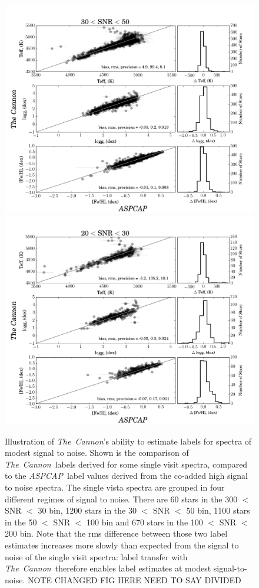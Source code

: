 \documentclass[12pt, preprint]{aastex}
\newcommand{\tc}{\textsl{The~Cannon}}
\newcommand{\aspcap}{\textsl{ASPCAP}}
\begin{document}
\begin{figure}[!h]
\includegraphics[scale=0.25]{./plots/SNR30to50.png}
\includegraphics[scale=0.25]{./plots/SNR20to30.png}
    \caption{Illustration of \tc's ability to estimate labels for spectra of modest signal to noise. Shown is the comparison of \tc\ labels derived for some single visit spectra, compared to the \aspcap\ label values derived from the co-added high signal to noise spectra. The single vista spectra are grouped in four different regimes of signal to noise. There are 60 stars in the 300 $<$  SNR $<$ 30 bin, 1200 stars in the 30 $<$ SNR $<$ 50 bin, 1100 stars in the 50 $<$ SNR $<$ 100 bin and 670 stars in the 100 $<$  SNR $<$ 200 bin. Note that the rms difference between those two label estimates increases more slowly than expected from the signal to noise of the single visit spectra: label transfer with \tc\  therefore enables label estimates at modest signal-to-noise. NOTE CHANGED FIG HERE NEED TO SAY DIVIDED}
\label{fig:SNR}
\end{figure}
\end{document}
